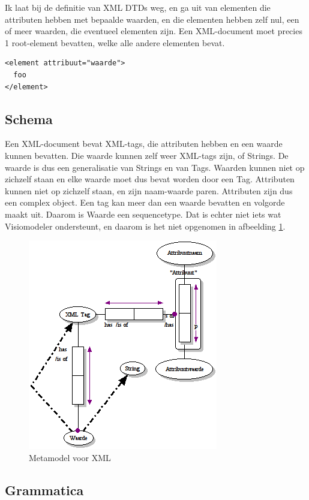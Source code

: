 \documentclass[10pt]{article}
\begin{document}
Ik laat bij de definitie van XML DTDs weg, en ga uit van elementen die
attributen hebben met bepaalde waarden, en die elementen hebben zelf nul, een
of meer waarden, die eventueel elementen zijn. Een XML-document moet precies
1 root-element bevatten, welke alle andere elementen bevat.

\begin{verbatim}
<element attribuut="waarde">
  foo
</element>
\end{verbatim} 

\subsection{Schema}

Een XML-document bevat XML-tags, die attributen hebben en een waarde kunnen
bevatten. Die waarde kunnen zelf weer XML-tags zijn, of Strings. De waarde is
dus een generalisatie van Strings en van Tags. Waarden kunnen niet op zichzelf
staan en elke waarde moet dus bevat worden door een Tag. Attributen kunnen niet
op zichzelf staan, en zijn naam-waarde paren. Attributen zijn dus een complex
object. Een tag kan meer dan een waarde bevatten en volgorde maakt uit. Daarom
is Waarde een sequencetype. Dat is echter niet iets wat Visiomodeler
ondersteunt, en daarom is het niet opgenomen in afbeelding \ref{fig:xmlmodel}.

\begin{figure}[htpb]
  \centering
  \includegraphics[scale=0.8]{xml.png}
  \caption{Metamodel voor XML}
  \label{fig:xmlmodel}
\end{figure}

\subsection{Grammatica}
\end{document}
